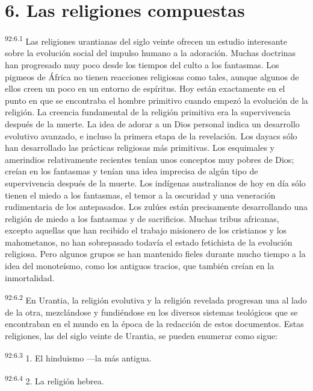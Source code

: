 \documentclass[twoside, 11pt]{book}
\begin{document}
\section*{6. Las religiones compuestas}
\par
\textsuperscript{92:6.1} Las religiones urantianas del siglo veinte ofrecen un estudio interesante sobre la evolución social del impulso humano a la adoración. Muchas doctrinas han progresado muy poco desde los tiempos del culto a los fantasmas. Los pigmeos de África no tienen reacciones religiosas como tales, aunque algunos de ellos creen un poco en un entorno de espíritus. Hoy están exactamente en el punto en que se encontraba el hombre primitivo cuando empezó la evolución de la religión. La creencia fundamental de la religión primitiva era la supervivencia después de la muerte. La idea de adorar a un Dios personal indica un desarrollo evolutivo avanzado, e incluso la primera etapa de la revelación. Los dayacs sólo han desarrollado las prácticas religiosas más primitivas. Los esquimales y amerindios relativamente recientes tenían unos conceptos muy pobres de Dios; creían en los fantasmas y tenían una idea imprecisa de algún tipo de supervivencia después de la muerte. Los indígenas australianos de hoy en día sólo tienen el miedo a los fantasmas, el temor a la oscuridad y una veneración rudimentaria de los antepasados. Los zulúes están precisamente desarrollando una religión de miedo a los fantasmas y de sacrificios. Muchas tribus africanas, excepto aquellas que han recibido el trabajo misionero de los cristianos y los mahometanos, no han sobrepasado todavía el estado fetichista de la evolución religiosa. Pero algunos grupos se han mantenido fieles durante mucho tiempo a la idea del monoteísmo, como los antiguos tracios, que también creían en la inmortalidad.

\par
\textsuperscript{92:6.2} En Urantia, la religión evolutiva y la religión revelada progresan una al lado de la otra, mezclándose y fundiéndose en los diversos sistemas teológicos que se encontraban en el mundo en la época de la redacción de estos documentos. Estas religiones, las del siglo veinte de Urantia, se pueden enumerar como sigue:

\par
\textsuperscript{92:6.3} 1. El hinduismo ---la más antigua.

\par
\textsuperscript{92:6.4} 2. La religión hebrea.
\end{document}
